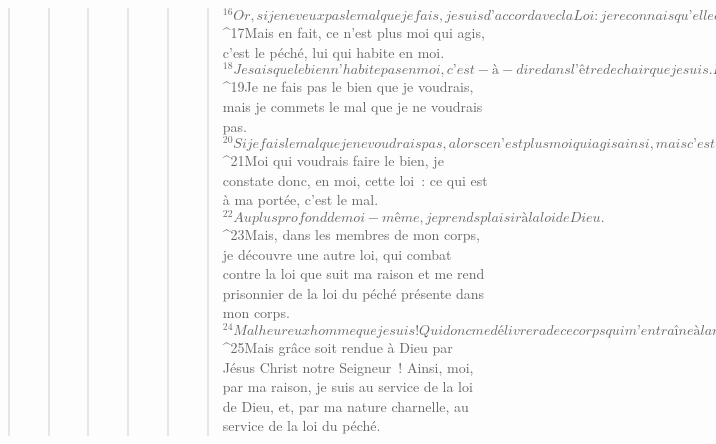 \begin{verse}
\begin{verse}
\begin{verse}
\begin{verse}
\begin{verse}
\begin{verse}
${}^{16}Or, si je ne veux pas le mal que je fais, je suis d’accord avec la Loi : je reconnais qu’elle est bonne. 
${}^{17}Mais en fait, ce n’est plus moi qui agis, c’est le péché, lui qui habite en moi.
${}^{18}Je sais que le bien n’habite pas en moi, c’est-à-dire dans l’être de chair que je suis. En effet, ce qui est à ma portée, c’est de vouloir le bien, mais pas de l’accomplir. 
${}^{19}Je ne fais pas le bien que je voudrais, mais je commets le mal que je ne voudrais pas. 
${}^{20}Si je fais le mal que je ne voudrais pas, alors ce n’est plus moi qui agis ainsi, mais c’est le péché, lui qui habite en moi. 
${}^{21}Moi qui voudrais faire le bien, je constate donc, en moi, cette loi : ce qui est à ma portée, c’est le mal. 
${}^{22}Au plus profond de moi-même, je prends plaisir à la loi de Dieu. 
${}^{23}Mais, dans les membres de mon corps, je découvre une autre loi, qui combat contre la loi que suit ma raison et me rend prisonnier de la loi du péché présente dans mon corps. 
${}^{24}Malheureux homme que je suis ! Qui donc me délivrera de ce corps qui m’entraîne à la mort ? 
${}^{25}Mais grâce soit rendue à Dieu par Jésus Christ notre Seigneur !
      Ainsi, moi, par ma raison, je suis au service de la loi de Dieu, et, par ma nature charnelle, au service de la loi du péché.
      

\end{verse}
\end{verse}
\end{verse}
\end{verse}
\end{verse}
\end{verse}
